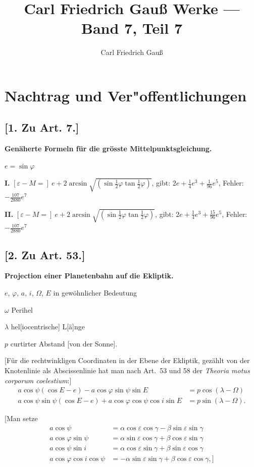 \documentclass[12pt,a4paper]{article}
\title{Carl Friedrich Gau\ss{} Werke --- Band 7, Teil 7}
\author{Carl Friedrich Gau\ss{}}
\date{}
\begin{document}
\maketitle

\section*{Nachtrag und Ver"offentlichungen}


\subsection*{[1. Zu Art. 7.]}
\textbf{Gen\"aherte Formeln f\"ur die gr\"osste Mittelpunktsgleichung.}

$e = \sin\varphi$

\medskip
\noindent
\textbf{I.} $[\varepsilon - M =]\ e + 2\arcsin\sqrt{(\sin\tfrac{1}{2}\varphi \tan\tfrac{1}{2}\varphi)}$, gibt: $2e + \tfrac{1}{4}e^3 + \tfrac{1}{96}e^5$, Fehler: $-\tfrac{107}{2880}e^7$

\medskip
\noindent
\textbf{II.} $[\varepsilon - M =]\ e + 2\arcsin\sqrt{(\sin\tfrac{1}{2}\varphi \tan\tfrac{1}{2}\varphi)}$, gibt: $2e + \tfrac{1}{4}e^3 + \tfrac{15}{96}e^5$, Fehler: $-\tfrac{107}{2880}e^7$

\newpage

\subsection*{[2. Zu Art. 53.]}
\textbf{Projection einer Planetenbahn auf die Ekliptik.}

$e$, $\varphi$, $a$, $i$, $\Omega$, $E$ in gew\"ohnlicher Bedeutung

$\omega$ Perihel

$\lambda$ hel[iocentrische] L[\"a]nge

$p$ curtirter Abstand [von der Sonne].

[F\"ur die rechtwinkligen Coordinaten in der Ebene der Ekliptik, gez\"ahlt
von der Knotenlinie als Abscissenlinie hat man nach Art.~53 und 58 der
\textit{Theoria motus corporum coelestium}:]
\begin{align*}
a\cos\psi(\cos E - e) - a\cos\varphi\sin\psi\sin E &= p\cos(\lambda - \Omega) \\
a\cos\psi\sin\psi(\cos E - e) + a\cos\varphi\cos\psi\cos i\sin E &= p\sin(\lambda - \Omega).
\end{align*}

[Man setze
\begin{align*}
a\cos\psi &= \alpha\cos\varepsilon\cos\gamma - \beta\sin\varepsilon\sin\gamma \\
a\cos\varphi\sin\psi &= \alpha\sin\varepsilon\cos\gamma + \beta\cos\varepsilon\sin\gamma \\
a\cos\psi\sin i &= \alpha\cos\varepsilon\sin\gamma + \beta\sin\varepsilon\cos\gamma \\
a\cos\varphi\cos i\cos\psi &= -\alpha\sin\varepsilon\sin\gamma + \beta\cos\varepsilon\cos\gamma,]
\end{align*}
\end{document}
